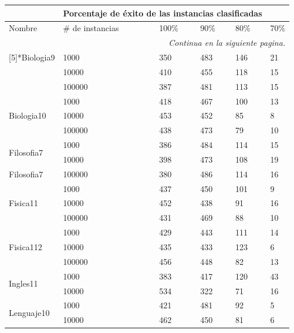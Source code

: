 \begin{longtable}{|p{3cm}|p{3cm}|p{2cm}|p{2cm}|p{2cm}|p{2cm}|}
\hline
	\rowcolor[gray]{0.5} 
	\multicolumn{2}{|c|}{Vista minable} &
	\multicolumn{4}{|c|}{Porcentaje de éxito de las instancias clasificadas}\\
	\hline
	\rowcolor[gray]{0.9} 
	Nombre & \# de instancias & 100\% & 90\% & 80\% & 70\%\\
	\hline
	\endhead
	\hline
	\multicolumn{6}{r}{\textit{Continua en la siguiente pagina.}} \\
	\endfoot
	\endlastfoot
\multirow{3}[5]{*}{Biologia9} & 1000  & 350   & 483   & 146   & 21 \\
\cline{2-6}      & 10000 & 410   & 455   & 118   & 15 \\
\cline{2-6}      & 100000 & 387   & 481   & 113   & 15 \\
\hline
\multirow{3}[6]{*}{Biologia10} & 1000  & 418   & 467   & 100   & 13 \\
\cline{2-6}      & 10000 & 453   & 452   & 85    & 8 \\
\cline{2-6}      & 100000 & 438   & 473   & 79    & 10 \\
\hline
\multirow{2}[6]{*}{Filosofia7} & 1000  & 386   & 484   & 114   & 15 \\
\cline{2-6}      & 10000 & 398   & 473   & 108   & 19 \\
Filosofia7      & 100000 & 380   & 486   & 114   & 16 \\
\hline
\multirow{3}[6]{*}{Fisica11} & 1000  & 437   & 450   & 101   & 9 \\
\cline{2-6}      & 10000 & 452   & 438   & 91    & 16 \\
\cline{2-6}      & 100000 & 431   & 469   & 88    & 10 \\
\hline
\multirow{3}[6]{*}{Fisica112} & 1000  & 429   & 443   & 111   & 14 \\
\cline{2-6}      & 10000 & 435   & 433   & 123   & 6 \\
\cline{2-6}      & 100000 & 456   & 448   & 82    & 13 \\
\hline
\multirow{2}[4]{*}{Ingles11} & 1000  & 383   & 417   & 120   & 43 \\
\cline{2-6}      & 10000 & 534   & 322   & 71    & 16 \\
\hline
\multirow{3}[6]{*}{Lenguaje10} & 1000  & 421   & 481   & 92    & 5 \\
\cline{2-6}      & 10000 & 462   & 450   & 81    & 6 \\

\end{longtable}
